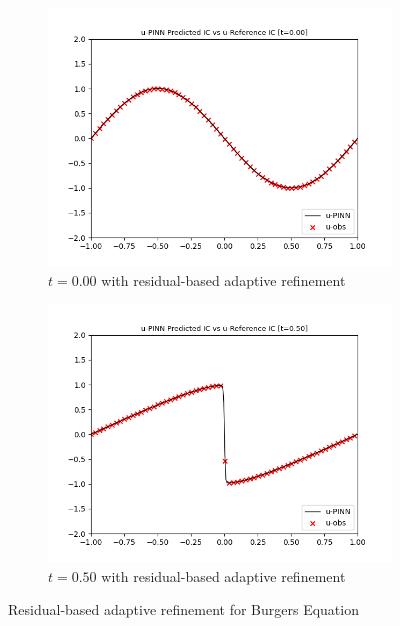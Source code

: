\documentclass[letterpaper,11pt]{article}
\begin{document}
\begin{figure}[h]
\begin{subfigure}{0.45\textwidth}
            \includegraphics*[width=\textwidth]{burgers_forward_t0.00_rar.png}
            \caption{$t = 0.00$ with residual-based adaptive refinement}
        \end{subfigure}
        \hfill
        \begin{subfigure}{0.45\textwidth}
            \includegraphics*[width=\textwidth]{burgers_forward_t0.50_rar.png}
            \caption{$t = 0.50$ with residual-based adaptive refinement}
        \end{subfigure}
        \caption{Residual-based adaptive refinement for Burgers Equation}
    \end{figure}
    \pagebreak

    \nocite{*}
    
    
\end{document}
